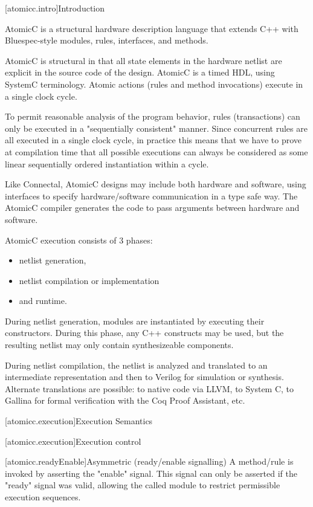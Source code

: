 [atomicc.intro]{Introduction}

AtomicC is a structural hardware description language that extends C++
with Bluespec-style modules, rules, interfaces, and methods.

AtomicC is structural in that all state elements in the hardware
netlist are explicit in the source code of the design. AtomicC is a
timed HDL, using SystemC terminology. 
Atomic actions (rules and method invocations) execute in a single clock cycle.

To permit reasonable analysis of the program behavior, rules (transactions) can only be
executed in a "sequentially consistent" manner.  Since concurrent rules are all executed in a
single clock cycle, in practice this means that we have to prove at compilation time that
all possible executions can always be considered as some linear sequentially ordered instantiation
within a cycle.

Like Connectal, AtomicC designs may include both hardware and
software, using interfaces to specify hardware/software communication
in a type safe way. The AtomicC compiler generates the code to pass
arguments between hardware and software.

AtomicC execution consists of 3 phases:
\begin{itemize}
\item netlist generation, 
\item netlist compilation or implementation
\item and runtime.
\end{itemize}

During netlist
generation, modules are instantiated by executing their
constructors. During this phase, any C++ constructs may be used, but
the resulting netlist may only contain synthesizeable components.

During netlist compilation, the netlist is analyzed and translated to
an intermediate representation and then to Verilog for simulation or
synthesis. Alternate translations are possible: to native code via
LLVM, to System C, to Gallina for formal verification with the Coq
Proof Assistant, etc.

[atomicc.execution]{Execution Semantics}

[atomicc.execution]{Execution control}

[atomicc.readyEnable]{Asymmetric (ready/enable signalling)}
A method/rule is invoked by asserting the "enable" signal.  This signal can only be
asserted if the "ready" signal was valid, allowing the called module to restrict
permissible execution sequences.

